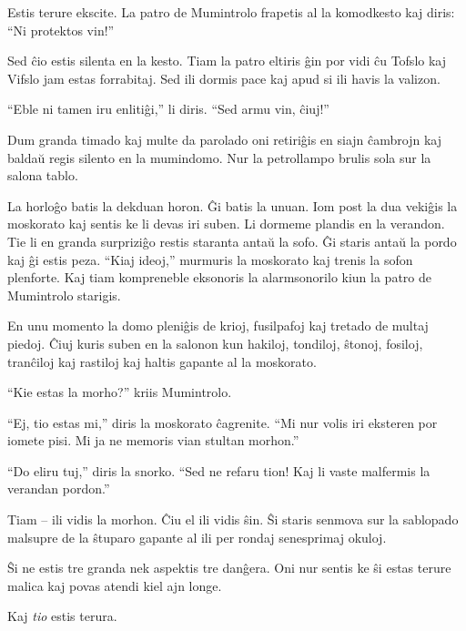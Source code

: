 Estis terure ekscite. La patro de Mumintrolo frapetis al la komodkesto kaj diris: ``Ni protektos vin!''

Sed ĉio estis silenta en la kesto. Tiam la patro eltiris ĝin por vidi ĉu Tofslo kaj Vifslo jam estas forrabitaj. Sed ili dormis pace kaj apud si ili havis la valizon.

``Eble ni tamen iru enlitiĝi,'' li diris. ``Sed armu vin, ĉiuj!''

Dum granda timado kaj multe da parolado oni retiriĝis en siajn ĉambrojn kaj baldaŭ regis silento en la mumindomo. Nur la petrollampo brulis sola sur la salona tablo.

La horloĝo batis la dekduan horon. Ĝi batis la unuan. Iom post la dua vekiĝis la moskorato kaj sentis ke li devas iri suben. Li dormeme plandis en la verandon. Tie li en granda surpriziĝo restis staranta antaŭ la sofo. Ĝi staris antaŭ la pordo kaj ĝi estis peza. ``Kiaj ideoj,'' murmuris la moskorato kaj trenis la sofon plenforte. Kaj tiam kompreneble eksonoris la alarmsonorilo kiun la patro de Mumintrolo starigis.

En unu momento la domo pleniĝis de krioj, fusilpafoj kaj tretado de multaj piedoj. Ĉiuj kuris suben en la salonon kun hakiloj, tondiloj, ŝtonoj, fosiloj, tranĉiloj kaj rastiloj kaj haltis gapante al la moskorato.

``Kie estas la morho?'' kriis Mumintrolo.

``Ej, tio estas mi,'' diris la moskorato ĉagrenite. ``Mi nur volis iri eksteren por iomete pisi. Mi ja ne memoris vian stultan morhon.''

``Do eliru tuj,'' diris la snorko. ``Sed ne refaru tion! Kaj li vaste malfermis la verandan pordon.''

Tiam -- ili vidis la morhon. Ĉiu el ili vidis ŝin. Ŝi staris senmova sur la sablopado malsupre de la ŝtuparo gapante al ili per rondaj senesprimaj okuloj.

Ŝi ne estis tre granda nek aspektis tre danĝera. Oni nur sentis ke ŝi estas terure malica kaj povas atendi kiel ajn longe.

Kaj \emph{tio} estis terura.


